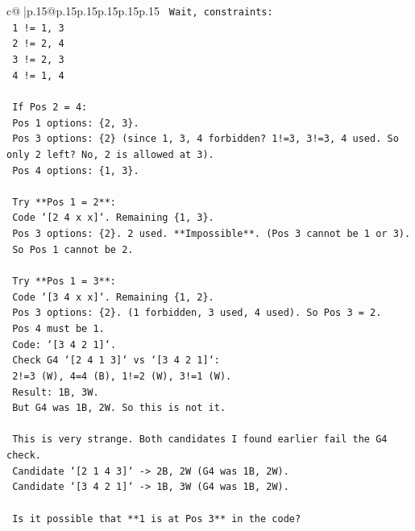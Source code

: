 \documentclass{article}
\begin{document}
{\begin{supertabular}{c@{$\;$}|p{.15\linewidth}@{}p{.15\linewidth}p{.15\linewidth}p{.15\linewidth}p{.15\linewidth}p{.15\linewidth}}
{{{\texttt{    Wait, constraints:} \\
\texttt{    1 != 1, 3} \\
\texttt{    2 != 2, 4} \\
\texttt{    3 != 2, 3} \\
\texttt{    4 != 1, 4} \\
\\ 
\texttt{    If Pos 2 = 4:} \\
\texttt{    Pos 1 options: \{2, 3\}.} \\
\texttt{    Pos 3 options: \{2\} (since 1, 3, 4 forbidden? 1!=3, 3!=3, 4 used. So only 2 left? No, 2 is allowed at 3).} \\
\texttt{    Pos 4 options: \{1, 3\}.} \\
\\ 
\texttt{    Try **Pos 1 = 2**:} \\
\texttt{    Code `{[}2 4 x x{]}`. Remaining \{1, 3\}.} \\
\texttt{    Pos 3 options: \{2\}. 2 used. **Impossible**. (Pos 3 cannot be 1 or 3).} \\
\texttt{    So Pos 1 cannot be 2.} \\
\\ 
\texttt{    Try **Pos 1 = 3**:} \\
\texttt{    Code `{[}3 4 x x{]}`. Remaining \{1, 2\}.} \\
\texttt{    Pos 3 options: \{2\}. (1 forbidden, 3 used, 4 used). So Pos 3 = 2.} \\
\texttt{    Pos 4 must be 1.} \\
\texttt{    Code: `{[}3 4 2 1{]}`.} \\
\texttt{    Check G4 `{[}2 4 1 3{]}` vs `{[}3 4 2 1{]}`:} \\
\texttt{    2!=3 (W), 4=4 (B), 1!=2 (W), 3!=1 (W).} \\
\texttt{    Result: 1B, 3W.} \\
\texttt{    But G4 was 1B, 2W. So this is not it.} \\
\\ 
\texttt{    This is very strange. Both candidates I found earlier fail the G4 check.} \\
\texttt{    Candidate `{[}2 1 4 3{]}` {-}> 2B, 2W (G4 was 1B, 2W).} \\
\texttt{    Candidate `{[}3 4 2 1{]}` {-}> 1B, 3W (G4 was 1B, 2W).} \\
\\ 
\texttt{    Is it possible that **1 is at Pos 3** in the code?} \\
}}}
\end{supertabular}}
\end{document}
